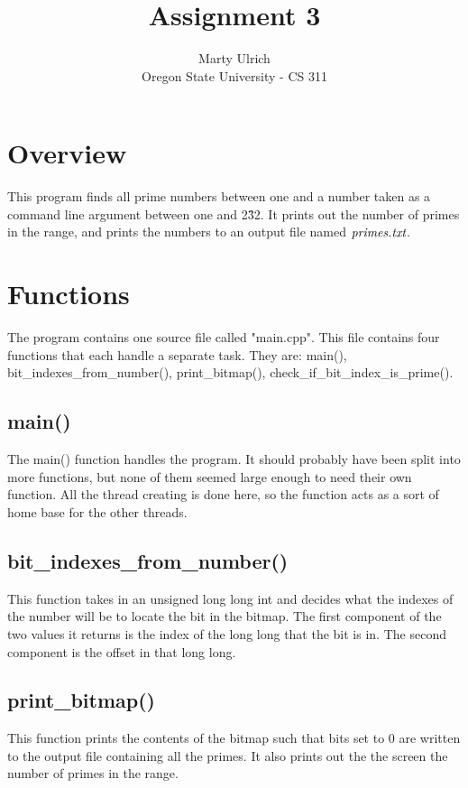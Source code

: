\documentclass[letterpaper,10pt,onecolumn,titlepage]{article}
\begin{document}
\title{Assignment 3}
\author{Marty Ulrich\\
Oregon State University - CS 311}
\renewcommand{\today}{March 1, 2012}
\maketitle

\section {Overview}
This program finds all prime numbers between one and a number taken as a command line argument between one and 2\^32.  It prints out the number of primes in the range, and prints the numbers to an output file named $\emph{primes.txt}$.  


\section {Functions}
	The program contains one source file called "main.cpp".  This file contains four functions that each handle a separate task.  They are: main(), bit\_indexes\_from\_number(), print\_bitmap(), check\_if\_bit\_index\_is\_prime().

	\subsection {main()}
	The main() function handles the program.  It should probably have been split into more functions, but none of them seemed large enough to need their own function.  All the thread creating is done here, so the function acts as a sort of home base for the other threads.

	\subsection{bit\_indexes\_from\_number()}
	This function takes in an unsigned long long int and decides what the indexes of the number will be to locate the bit in the bitmap.  The first component of the two values it returns is the index of the long long that the bit is in.  The second component is the offset in that long long.

	\subsection{print\_bitmap()}
	This function prints the contents of the bitmap such that bits set to 0 are written to the output file containing all the primes.  It also prints out the the screen the number of primes in the range.
\end{document}
